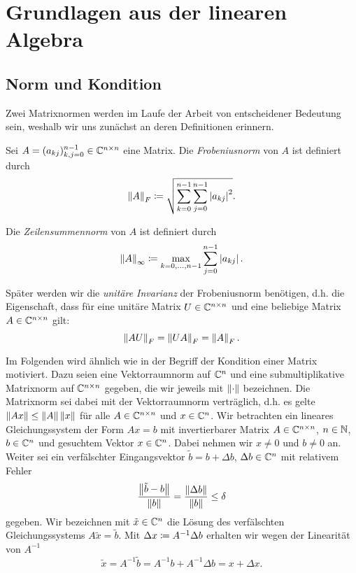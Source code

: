 \chapter{Grundlagen aus der linearen Algebra}
\section{Norm und Kondition}
Zwei Matrixnormen werden im Laufe der Arbeit von entscheidener Bedeutung sein,
weshalb wir uns zunächst an deren Definitionen erinnern.

\begin{mydef}
    Sei $A = (a_{kj})_{k,j=0}^{n-1} \in \mathbb{C}^{n\times n}$ eine Matrix.
    Die \emph{Frobeniusnorm} von $A$ ist definiert durch
    \begin{equation}
        \label{eq:frobenius_norm}
        \left\lVert A \right\rVert_F
        \coloneqq \sqrt{ \sum_{k=0}^{n-1} \sum_{j=0}^{n-1} \left\lvert a_{kj} \right\rvert^2}.
    \end{equation}

    \noindent Die \emph{Zeilensummennorm} von $A$ ist definiert durch
    \begin{equation}
        \label{eq:infinity_norm}
        \left\lVert A \right\rVert_\infty
        \coloneqq \max_{k=0, \dots, n-1} \sum_{j=0}^{n-1} \left\lvert a_{kj} \right\rvert.
    \end{equation}
\end{mydef}

\begin{remark}
    Später werden wir die \emph{unitäre Invarianz} der
    Frobeniusnorm benötigen, d.h. die Eigenschaft, dass für eine unitäre Matrix
    $U \in \mathbb{C}^{n\times n}$ und eine beliebige Matrix ${A \in \mathbb{C}^{n\times n}}$
    gilt:
    \[
        \left\lVert A U \right\rVert_F = \left\lVert U A \right\rVert_F = \left\lVert A \right\rVert_F.
    \]
\end{remark}

Im Folgenden wird ähnlich wie in \cite[S. 205ff]{stoer1} der Begriff der Kondition
einer Matrix motiviert.  Dazu seien eine Vektorraumnorm auf $\mathbb{C}^n$ und eine
submultiplikative Matrixnorm auf $\mathbb{C}^{n\times n}$ gegeben, die wir jeweils mit
$\left\lVert \cdot \right\rVert$ bezeichnen. Die Matrixnorm sei dabei mit der Vektorraumnorm
verträglich, d.h. es gelte $ \left\lVert Ax \right\rVert \leq \left\lVert A \right\rVert\left\lVert x \right\rVert$ für alle $A \in
\mathbb{C}^{n\times n}$ und $x \in \mathbb{C}^n$.
Wir betrachten ein lineares Gleichungssystem der Form
$Ax = b$ mit invertierbarer Matrix
$A \in \mathbb{C}^{n \times n}$, $n \in \mathbb{N}$, $b \in \mathbb{C}^n$
und gesuchtem Vektor $x \in \mathbb{C}^n$.
Dabei nehmen wir $x \neq 0$ und $b \neq 0$ an.
Weiter sei ein verfälschter Eingangsvektor $\tilde{b} = b + \Delta b$,
$\Delta b \in \mathbb{C}^n$ mit relativem Fehler
\[
    \frac{\left\lVert \tilde{b} - b \right\rVert}{\left\lVert b \right\rVert} = \frac{\left\lVert \Delta b \right\rVert}{\left\lVert b \right\rVert} \leq \delta
\]
gegeben.
Wir bezeichnen mit $\tilde{x} \in \mathbb{C}^n$ die Lösung des verfälschten Gleichungssystems
$A \tilde{x} = \tilde{b}$.
Mit $\Delta x \coloneqq A^{-1} \Delta b$ erhalten wir wegen der Linearität von $A^{-1}$
\[
    \tilde{x} = A^{-1} \tilde{b} = A^{-1} b + A^{-1} \Delta b = x + \Delta x.
\]


